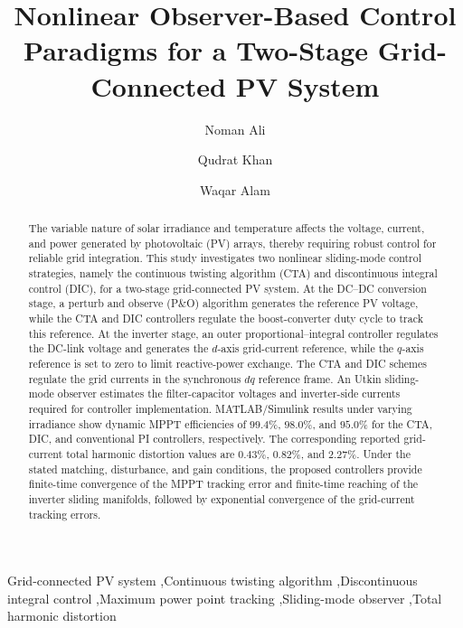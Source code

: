\documentclass[preprint,12pt]{elsarticle}
\begin{document}
\begin{frontmatter}

\title{Nonlinear Observer-Based Control Paradigms for a Two-Stage Grid-Connected PV System}

\author{Noman Ali}
\author{Qudrat Khan}
\author{Waqar Alam}



\begin{abstract}
The variable nature of solar irradiance and temperature affects the voltage, current, and power generated by photovoltaic (PV) arrays, thereby requiring robust control for reliable grid integration. This study investigates two nonlinear sliding-mode control strategies, namely the continuous twisting algorithm (CTA) and discontinuous integral control (DIC), for a two-stage grid-connected PV system. At the DC--DC conversion stage, a perturb and observe (P\&O) algorithm generates the reference PV voltage, while the CTA and DIC controllers regulate the boost-converter duty cycle to track this reference. At the inverter stage, an outer proportional--integral controller regulates the DC-link voltage and generates the $d$-axis grid-current reference, while the $q$-axis reference is set to zero to limit reactive-power exchange. The CTA and DIC schemes regulate the grid currents in the synchronous $dq$ reference frame. An Utkin sliding-mode observer estimates the filter-capacitor voltages and inverter-side currents required for controller implementation. MATLAB/Simulink results under varying irradiance show dynamic MPPT efficiencies of $99.4\%$, $98.0\%$, and $95.0\%$ for the CTA, DIC, and conventional PI controllers, respectively. The corresponding reported grid-current total harmonic distortion values are $0.43\%$, $0.82\%$, and $2.27\%$. Under the stated matching, disturbance, and gain conditions, the proposed controllers provide finite-time convergence of the MPPT tracking error and finite-time reaching of the inverter sliding manifolds, followed by exponential convergence of the grid-current tracking errors.
\end{abstract}

\begin{keyword}
Grid-connected PV system \sep Continuous twisting algorithm \sep Discontinuous integral control \sep Maximum power point tracking \sep Sliding-mode observer \sep Total harmonic distortion
\end{keyword}

\end{frontmatter}
\end{document}
